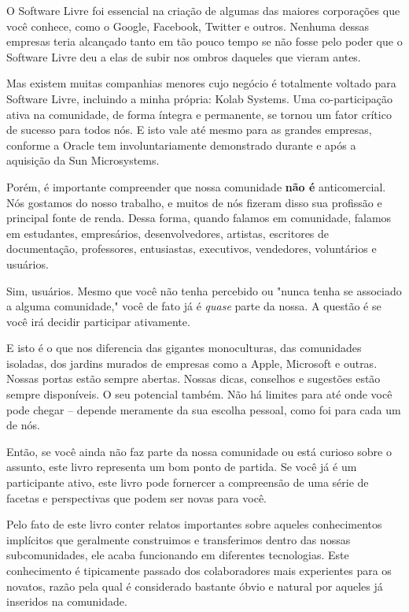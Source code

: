 O Software Livre foi essencial na criação de algumas das maiores
corporações que você conhece, como o Google, Facebook, Twitter e outros.
Nenhuma dessas empresas teria alcançado tanto em tão pouco tempo se não
fosse pelo poder que o Software Livre deu a elas de subir nos ombros daqueles
que vieram antes.

Mas existem muitas companhias menores cujo negócio é totalmente
voltado para Software Livre, incluindo a minha própria: Kolab Systems.
Uma co-participação ativa na comunidade, de forma íntegra e permanente,
se tornou um fator crítico de sucesso para todos nós. E isto vale até
mesmo para as grandes empresas, conforme a Oracle tem involuntariamente
demonstrado durante e após a aquisição da Sun Microsystems.

Porém, é importante compreender que nossa comunidade \textbf{não é}
anticomercial. Nós gostamos do nosso trabalho, e muitos de nós fizeram
disso sua profissão e principal fonte de renda. Dessa forma, quando
falamos em comunidade, falamos em estudantes, empresários, desenvolvedores,
artistas, escritores de documentação, professores, entusiastas, executivos,
vendedores, voluntários e usuários.

Sim, usuários. Mesmo que você não tenha percebido ou "nunca tenha se
associado a alguma comunidade," você de fato já é \emph{quase} parte
da nossa. A questão é se você irá decidir participar ativamente.

E isto é o que nos diferencia das gigantes monoculturas, das comunidades
isoladas, dos jardins murados de empresas como a Apple, Microsoft e
outras. Nossas portas estão sempre abertas. Nossas dicas, conselhos
e sugestões estão sempre disponíveis. O seu potencial também. Não há
limites para até onde você pode chegar -- depende meramente da sua
escolha pessoal, como foi para cada um de nós.

Então, se você ainda não faz parte da nossa comunidade ou está curioso
sobre o assunto, este livro representa um bom ponto de partida. Se
você já é um participante ativo, este livro pode fornercer a 
compreensão de uma série de facetas e perspectivas que podem ser novas
para você.

Pelo fato de este livro conter relatos importantes sobre aqueles
conhecimentos implícitos que geralmente construimos e transferimos
dentro das nossas subcomunidades, ele acaba funcionando em diferentes
tecnologias. Este conhecimento é tipicamente passado dos colaboradores
mais experientes para os novatos, razão pela qual é considerado bastante
óbvio e natural por aqueles já inseridos na comunidade.

